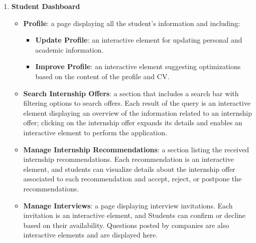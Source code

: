 \begin{enumerate}
    \item \textbf{Student Dashboard}
    \begin{itemize}
        \item \textbf{Profile}: a page displaying all the student's information and including:
            \begin{itemize}
            \item \textbf{Update Profile}: an interactive element for updating personal and academic information.
            \item \textbf{Improve Profile}: an interactive element suggesting optimizations based on the content of the profile and CV.
            \end{itemize}
        \item \textbf{Search Internship Offers}: a section that includes a search bar with filtering options to search offers. Each result of the query is an interactive element displaying an overview of the information related to an internship offer; clicking on the internship offer expands its details and enables an interactive element to perform the application.
        \item \textbf{Manage Internship Recommendations}: a section listing the received internship recommendations. Each recommendation is an interactive element, and students can visualize details about the internship offer associated to each recommendation and accept, reject, or postpone the recommendations.
        \item \textbf{Manage Interviews}: a page displaying interview invitations. Each invitation is an interactive element, and Students can confirm or decline based on their availability. Questions posted by companies are also interactive elements and are displayed here.
    \end{itemize}


\end{enumerate}
